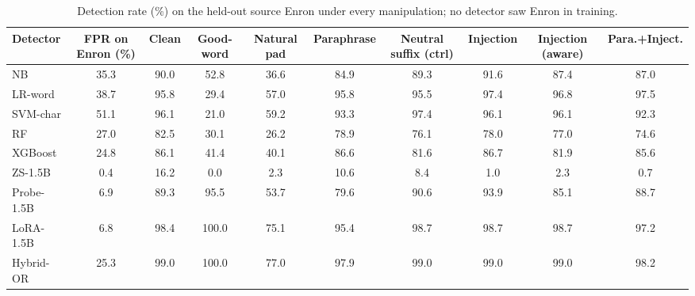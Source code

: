 \begin{table}[t]
\centering
\caption{Detection rate (\%) on the held-out source Enron under every manipulation; no detector saw Enron in training.}
\label{tab:xsrc}
\footnotesize
\begin{tabular}{lccccccccc}
\toprule
\textbf{Detector} & \textbf{FPR on Enron (\%)} & \textbf{Clean} & \textbf{Good-word} & \textbf{Natural pad} & \textbf{Paraphrase} & \textbf{Neutral suffix (ctrl)} & \textbf{Injection} & \textbf{Injection (aware)} & \textbf{Para.+Inject.} \\
\midrule
NB & 35.3 & 90.0 & 52.8 & 36.6 & 84.9 & 89.3 & 91.6 & 87.4 & 87.0 \\
LR-word & 38.7 & 95.8 & 29.4 & 57.0 & 95.8 & 95.5 & 97.4 & 96.8 & 97.5 \\
SVM-char & 51.1 & 96.1 & 21.0 & 59.2 & 93.3 & 97.4 & 96.1 & 96.1 & 92.3 \\
RF & 27.0 & 82.5 & 30.1 & 26.2 & 78.9 & 76.1 & 78.0 & 77.0 & 74.6 \\
XGBoost & 24.8 & 86.1 & 41.4 & 40.1 & 86.6 & 81.6 & 86.7 & 81.9 & 85.6 \\
ZS-1.5B & 0.4 & 16.2 & 0.0 & 2.3 & 10.6 & 8.4 & 1.0 & 2.3 & 0.7 \\
Probe-1.5B & 6.9 & 89.3 & 95.5 & 53.7 & 79.6 & 90.6 & 93.9 & 85.1 & 88.7 \\
LoRA-1.5B & 6.8 & 98.4 & 100.0 & 75.1 & 95.4 & 98.7 & 98.7 & 98.7 & 97.2 \\
Hybrid-OR & 25.3 & 99.0 & 100.0 & 77.0 & 97.9 & 99.0 & 99.0 & 99.0 & 98.2 \\
\bottomrule
\end{tabular}
\end{table}